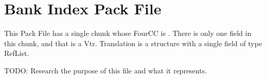 \section{Bank Index Pack File}
\label{sec:pfABIX}

This Pack File has a single chunk whose FourCC is .
There is only one field in this chunk, and that is a Vtr.
Translation is a structure with a single field of type RefList.

TODO: Research the purpose of this file and what it represents.

